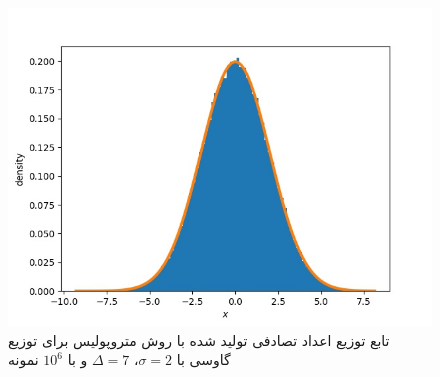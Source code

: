 \documentclass[11pt, a4paper]{article}
\begin{document}
\begin{figure}
  \centering
  \includegraphics[width=.7\textwidth]{q4_0_1000000_7.jpg}
  \caption{تابع توزیع اعداد تصادفی تولید شده با روش متروپولیس برای توزیع گاوسی با $\sigma = 2$، $\Delta = 7$ و با $10^6$ نمونه}
  \label{fig:q4_distrubation}
\end{figure}
\end{document}
